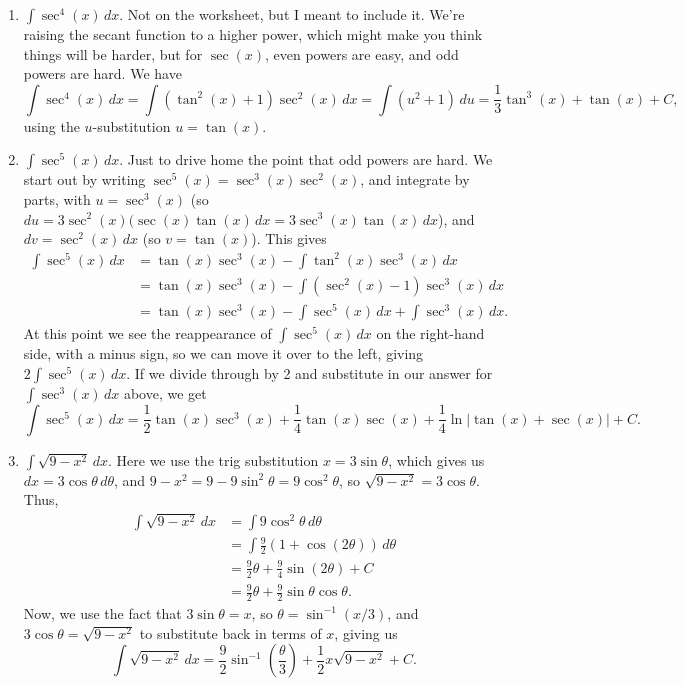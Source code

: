\documentclass[12pt]{article}
\newcommand{\di}{\displaystyle}
\newcommand{\abs}[1]{\lvert #1\rvert}
\begin{document}
\begin{enumerate}
\item $\int \sec^4(x)\,dx$. Not on the worksheet, but I meant to include it. We're raising the secant function to a higher power, which might make you think things will be harder, but for $\sec(x)$, even powers are easy, and odd powers are hard. We have
\[
\int \sec^4(x)\,dx = \int (\tan^2(x)+1)\sec^2(x)\,dx = \int (u^2+1)\,du = \frac{1}{3}\tan^3(x)+\tan(x)+C,
\]
using the $u$-substitution $u=\tan(x)$.

\pagebreak

 \item $\di \int \sec^5(x)\,dx$. Just to drive home the point that odd powers are hard. We start out by writing $\sec^5(x) = \sec^3(x)\sec^2(x)$, and integrate by parts, with $u=\sec^3(x)$ (so $du = 3\sec^2(x)(\sec(x)\tan(x)\,dx = 3\sec^3(x)\tan(x)\,dx$), and $dv = \sec^2(x)\,dx$ (so $v=\tan(x)$). This gives
 \begin{align*}
 \int \sec^5(x)\,dx &= \tan(x)\sec^3(x) - \int \tan^2(x)\sec^3(x)\,dx\\
 & = \tan(x)\sec^3(x) - \int (\sec^2(x)-1)\sec^3(x)\,dx\\
 & = \tan(x)\sec^3(x) - \int \sec^5(x)\,dx +\int \sec^3(x)\,dx.
 \end{align*}
 At this point we see the reappearance of $\int\sec^5(x)\,dx$ on the right-hand side, with a minus sign, so we can move it over to the left, giving $2\int \sec^5(x)\,dx$. If we divide through by 2 and substitute in our answer for $\int \sec^3(x)\,dx$ above, we get
 \[
 \int \sec^5(x)\,dx = \frac{1}{2}\tan(x)\sec^3(x) + \frac{1}{4}\tan(x)\sec(x) +\frac{1}{4}\ln\abs{\tan(x)+\sec(x)}+C.
 \]



 \item $\di \int \sqrt{9-x^2}\,dx$. Here we use the trig substitution $x=3\sin\theta$, which gives us $dx = 3\cos\theta\,d\theta$, and $9-x^2 = 9-9\sin^2\theta = 9\cos^2\theta$, so $\sqrt{9-x^2} = 3\cos\theta$. Thus,
 \begin{align*}
 \int \sqrt{9-x^2}\,dx & = \int 9\cos^2\theta\,d\theta\\
 & = \int \frac{9}{2}(1+\cos(2\theta))\,d\theta\\
 & = \frac{9}{2}\theta + \frac{9}{4}\sin(2\theta)+C\\
 & = \frac{9}{2}\theta + \frac{9}{2}\sin\theta\cos\theta.
 \end{align*}
 Now, we use the fact that $3\sin\theta = x$, so $\theta = \sin^{-1}(x/3)$, and $3\cos\theta = \sqrt{9-x^2}$ to substitute back in terms of $x$, giving us
 \[
 \int \sqrt{9-x^2}\,dx = \frac{9}{2}\sin^{-1}\left(\frac{\theta}{3}\right)+\frac{1}{2}x\sqrt{9-x^2}+C.
 \]
 

\end{enumerate}
\end{document}
